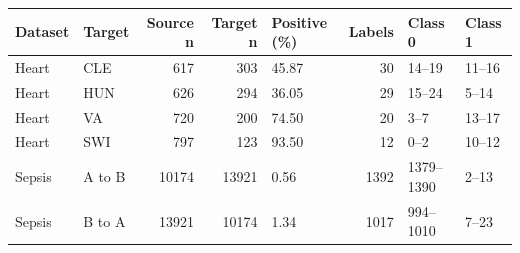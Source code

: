 \begin{tabular}{llrrlrll}
\toprule
Dataset & Target & Source n & Target n & Positive (\%) & Labels & Class 0 & Class 1 \\
\midrule
Heart & CLE & 617 & 303 & 45.87 & 30 & 14--19 & 11--16 \\
Heart & HUN & 626 & 294 & 36.05 & 29 & 15--24 & 5--14 \\
Heart & VA & 720 & 200 & 74.50 & 20 & 3--7 & 13--17 \\
Heart & SWI & 797 & 123 & 93.50 & 12 & 0--2 & 10--12 \\
Sepsis & A to B & 10174 & 13921 & 0.56 & 1392 & 1379--1390 & 2--13 \\
Sepsis & B to A & 13921 & 10174 & 1.34 & 1017 & 994--1010 & 7--23 \\
\bottomrule
\end{tabular}
